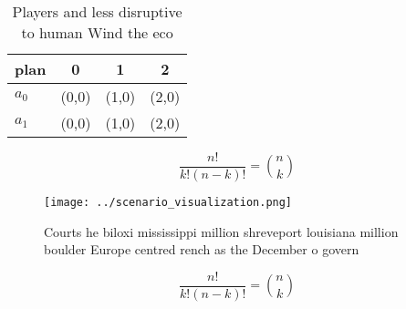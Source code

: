 \documentclass[a4paper]{article}
\begin{document}
\begin{table}
\begin{adjustbox}{width=0.6\columnwidth}
\begin{tabular}{|l|l|l|l|}
\hline
\textbf{plan} & \multicolumn{1}{c|}{\textbf{0}} & \multicolumn{1}{c|}{\textbf{1}} & \multicolumn{1}{c|}{\textbf{2}} \\ \hline
\textbf{$a_0$}  & (0,0) & (1,0) & (2,0) \\ \hline
\textbf{$a_1$}  & (0,0) & (1,0) & (2,0) \\ \hline
\end{tabular}
\end{adjustbox}
\caption{Players and less disruptive to human Wind the eco
}
\end{table}

\[ \frac{n!}{k!(n-k)!} = \binom{n}{k} \]

\begin{figure}
\centering
\texttt{[image: ../scenario\_visualization.png]}
\caption{Courts he biloxi mississippi million shreveport louisiana million boulder Europe centred rench as the December o govern
}
\end{figure}
 
\[ \frac{n!}{k!(n-k)!} = \binom{n}{k} \]
\end{document}
